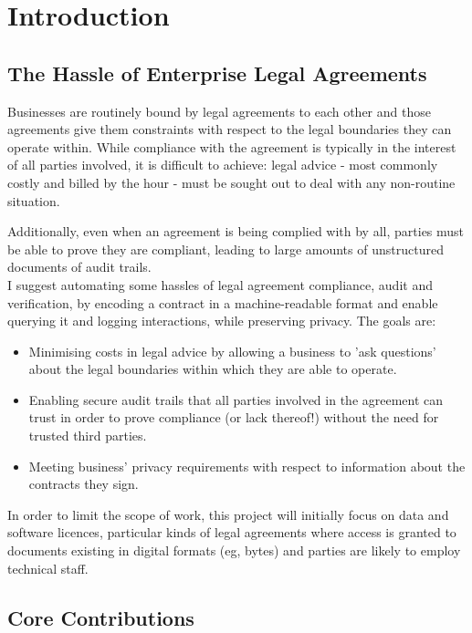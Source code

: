 \chapter{Introduction}\label{ch:introduction}

\section*{The Hassle of Enterprise Legal Agreements}\label{sec:intro:legal-hassle}

Businesses are routinely bound by legal agreements to each other and those agreements give them
constraints with respect to the legal boundaries they can operate within.
While compliance with the agreement is typically in the interest of all parties involved, it is
difficult to achieve: legal advice - most commonly costly and billed by the hour - must be sought
out to deal with any non-routine situation.

Additionally, even when an agreement is being complied with by all, parties must be able to prove
they are compliant, leading to large amounts of unstructured documents of audit trails.\\

I suggest automating some hassles of legal agreement compliance, audit and verification, by encoding
a contract in a machine-readable format and enable querying it and logging interactions, while
preserving privacy.
The goals are:
\begin{itemize}
    \item Minimising costs in legal advice by allowing a business to 'ask questions' about the legal
    boundaries within which they are able to operate.
    \item Enabling secure audit trails that all parties involved in the agreement can trust in order
    to prove compliance (or lack thereof!) without the need for trusted third parties.
    \item Meeting business' privacy requirements with respect to information about the contracts
    they sign.
\end{itemize}

In order to limit the scope of work, this project will initially focus on data and software
licences, particular kinds of legal agreements where access is granted to documents existing in
digital formats (eg, bytes) and parties are likely to employ technical staff.

\section{Core Contributions}
